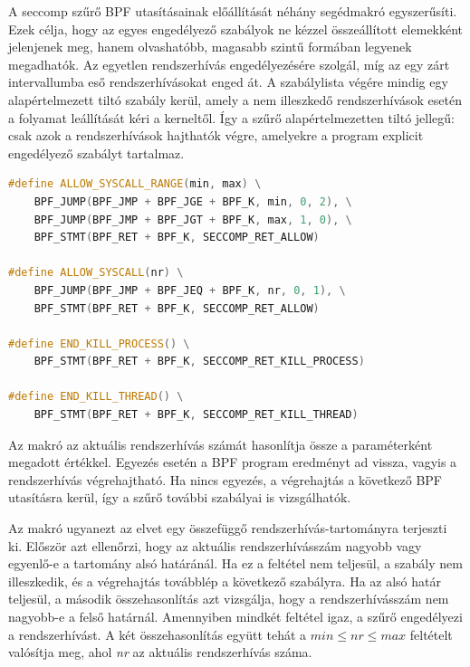 A seccomp szűrő BPF utasításainak előállítását néhány segédmakró egyszerűsíti.
Ezek célja, hogy az egyes engedélyező szabályok ne kézzel összeállított
 elemekként jelenjenek meg, hanem olvashatóbb, magasabb
szintű formában legyenek megadhatók. Az  egyetlen
rendszerhívás engedélyezésére szolgál, míg az 
egy zárt intervallumba eső rendszerhívásokat enged át. A szabálylista végére
mindig egy alapértelmezett tiltó szabály kerül, amely a nem illeszkedő
rendszerhívások esetén a folyamat leállítását kéri a kerneltől. Így a szűrő
alapértelmezetten tiltó jellegű: csak azok a rendszerhívások hajthatók végre,
amelyekre a program explicit engedélyező szabályt tartalmaz.

\begin{lstlisting}[float, language=C++,caption={Seccomp BPF szabályokat létrehozó segédmakrók}]
#define ALLOW_SYSCALL_RANGE(min, max) \
    BPF_JUMP(BPF_JMP + BPF_JGE + BPF_K, min, 0, 2), \
    BPF_JUMP(BPF_JMP + BPF_JGT + BPF_K, max, 1, 0), \
    BPF_STMT(BPF_RET + BPF_K, SECCOMP_RET_ALLOW)

#define ALLOW_SYSCALL(nr) \
    BPF_JUMP(BPF_JMP + BPF_JEQ + BPF_K, nr, 0, 1), \
    BPF_STMT(BPF_RET + BPF_K, SECCOMP_RET_ALLOW)

#define END_KILL_PROCESS() \
    BPF_STMT(BPF_RET + BPF_K, SECCOMP_RET_KILL_PROCESS)

#define END_KILL_THREAD() \
    BPF_STMT(BPF_RET + BPF_K, SECCOMP_RET_KILL_THREAD)
\end{lstlisting}

Az  makró az aktuális rendszerhívás számát hasonlítja össze
a paraméterként megadott értékkel. Egyezés esetén a BPF program
 eredményt ad vissza, vagyis a rendszerhívás
végrehajtható. Ha nincs egyezés, a végrehajtás a következő BPF utasításra
kerül, így a szűrő további szabályai is vizsgálhatók.

Az  makró ugyanezt az elvet egy
összefüggő rendszerhívás-tartományra terjeszti ki. Először azt ellenőrzi, hogy
az aktuális rendszerhívásszám nagyobb vagy egyenlő-e a tartomány alsó határánál.
Ha ez a feltétel nem teljesül, a szabály nem illeszkedik, és a végrehajtás
továbblép a következő szabályra. Ha az alsó határ teljesül, a második
összehasonlítás azt vizsgálja, hogy a rendszerhívásszám nem nagyobb-e a felső
határnál. Amennyiben mindkét feltétel igaz, a szűrő engedélyezi a
rendszerhívást. A két összehasonlítás együtt tehát a
$\mathit{min} \leq \mathit{nr} \leq \mathit{max}$ feltételt valósítja meg, ahol
\emph{nr} az aktuális rendszerhívás száma.

